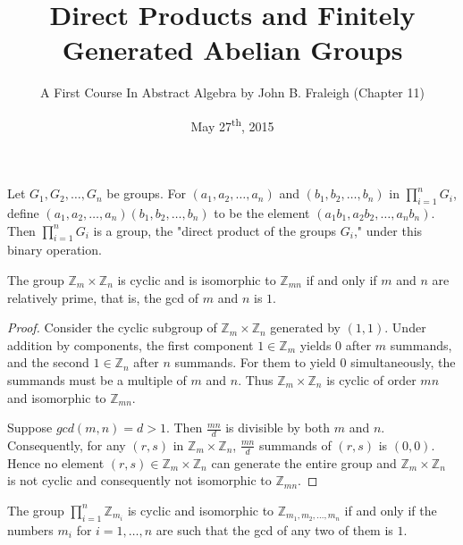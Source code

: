 \documentclass[a4paper,8pt]{article}
\title{Direct Products and Finitely Generated Abelian Groups}
\author{A First Course In Abstract Algebra by John B. Fraleigh (Chapter 11)}
\date{May 27\textsuperscript{th}, 2015}
\begin{document}
\maketitle
{}

\begin{outline}

    Let \(G_{1}, G_{2}, \ldots, G_{n}\) be groups. For \((a_{1}, a_{2}, \ldots, a_{n})\) and
    \((b_{1}, b_{2}, \ldots, b_{n})\) in \(\prod_{i=1}^{n} G_{i}\), define \((a_{1}, a_{2}, \ldots,
    a_{n})(b_{1},  b_{2}, \ldots, b_{n})\) to be the element \((a_{1}b_{1}, a_{2}b_{2}, \ldots, a_{n}b_{n})\). Then
    \(\prod_{i=1}^{n} G_{i}\) is a group, the "direct product of the groups \(G_{i}\)," under this binary operation.

    The group \(\mathbb{Z}_{m} \times \mathbb{Z}_{n}\) is cyclic and is isomorphic to
    \(\mathbb{Z}_{mn}\) if and only if \(m\) and \(n\) are relatively prime, that is, the gcd of \(m\) and \(n\)
    is \(1\).

    \begin{proof}
      \forward
        Consider the cyclic subgroup of \(\mathbb{Z}_{m} \times \mathbb{Z}_{n}\) generated
        by \((1, 1)\). Under addition by components, the first component \(1 \in \mathbb{Z}_{m}\) yields \(0\)
        after \(m\) summands, and the second \(1 \in \mathbb{Z}_{n}\) after \(n\) summands. For them to
        yield \(0\) simultaneously, the summands must be a multiple of \(m\) and \(n\). Thus
        \(\mathbb{Z}_{m} \times \mathbb{Z}_{n}\) is cyclic of order \(mn\) and isomorphic to \(\mathbb{Z}_{mn}\).

      \backward
        Suppose \(gcd(m, n) = d > 1\). Then \(\frac{mn}{d}\) is divisible by both \(m\) and \(n\).
        Consequently, for any \((r, s)\) in \(\mathbb{Z}_{m} \times \mathbb{Z}_{n}\), \(\frac{mn}{d}\) summands
        of \((r, s)\) is \((0, 0)\). Hence no element \((r, s) \in \mathbb{Z}_{m} \times \mathbb{Z}_{n}\) can
        generate the entire group and \(\mathbb{Z}_{m} \times \mathbb{Z}_{n}\) is not cyclic and consequently not
        isomorphic to \(\mathbb{Z}_{mn}\).

    \end{proof}

    The group \(\prod_{i=1}^{n} \mathbb{Z}_{m_{i}}\) is cyclic and isomorphic to \(\mathbb{Z}_{m_{1},
    m_{2}, \ldots, m_{n}}\) if and only if the numbers \(m_{i}\) for \(i = 1, \ldots, n\) are such that
    the gcd of any two of them is \(1\).


\end{outline}
\end{document}
